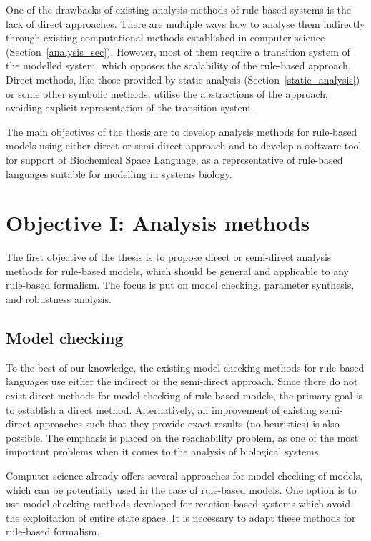 \documentclass[11pt,a4paper]{report}
\begin{document}
One of the drawbacks of existing analysis methods of rule-based systems is the lack of direct approaches. There are multiple ways how to analyse them indirectly through existing computational methods established in computer science (Section~\ref{analysis_sec}). However, most of them require a transition system of the modelled system, which opposes the scalability of the rule-based approach. Direct methods, like those provided by static analysis (Section~\ref{static_analysis}) or some other symbolic methods, utilise the abstractions of the approach, avoiding explicit representation of the transition system. 

The main objectives of the thesis are to develop analysis methods for rule-based models using either direct or semi-direct approach and to develop a software tool for support of Biochemical Space Language, as a representative of rule-based languages suitable for modelling in systems biology.

\section{Objective I: Analysis methods}

The first objective of the thesis is to propose direct or semi-direct analysis methods for rule-based models, which should be general and applicable to any rule-based formalism. The focus is put on model checking, parameter synthesis, and robustness analysis.

\subsection{Model checking}

To the best of our knowledge, the existing model checking methods for rule-based languages use either the indirect or the semi-direct approach. Since there do not exist direct methods for model checking of rule-based models, the primary goal is to establish a direct method. Alternatively, an improvement of existing semi-direct approaches such that they provide exact results (no heuristics) is also possible. The emphasis is placed on the reachability problem, as one of the most important problems when it comes to the analysis of biological systems.

Computer science already offers several approaches for model checking of models, which can be potentially used in the case of rule-based models. One option is to use model checking methods developed for reaction-based systems which avoid the exploitation of entire state space. It is necessary to adapt these methods for rule-based formalism.
\end{document}
